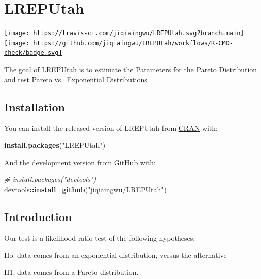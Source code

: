 \documentclass[
]{article}
\author{}
\date{\vspace{-2.5em}}
\newenvironment{Shaded}{\begin{snugshade}}{\end{snugshade}}
\newcommand{\CommentTok}[1]{\textcolor[rgb]{0.56,0.35,0.01}{\textit{#1}}}
\newcommand{\KeywordTok}[1]{\textcolor[rgb]{0.13,0.29,0.53}{\textbf{#1}}}
\newcommand{\NormalTok}[1]{#1}
\newcommand{\OperatorTok}[1]{\textcolor[rgb]{0.81,0.36,0.00}{\textbf{#1}}}
\newcommand{\StringTok}[1]{\textcolor[rgb]{0.31,0.60,0.02}{#1}}
\begin{document}
\hypertarget{lreputah}{%
\section{LREPUtah}\label{lreputah}}

\href{https://travis-ci.com/jiqiaingwu/LREPUtah}{\texttt{[image: https://travis-ci.com/jiqiaingwu/LREPUtah.svg?branch=main]}}
\href{https://github.com/jiqiaingwu/LREPUtah/actions}{\texttt{[image: https://github.com/jiqiaingwu/LREPUtah/workflows/R-CMD-check/badge.svg]}}

The goal of LREPUtah is to estimate the Parameters for the Pareto
Distribution and test Pareto vs.~Exponential Distributions

\hypertarget{installation}{%
\subsection{Installation}\label{installation}}

You can install the released version of LREPUtah from
\href{https://CRAN.R-project.org}{CRAN} with:

\begin{Shaded}
\begin{Highlighting}[]
\KeywordTok{install.packages}\NormalTok{(}\StringTok{"LREPUtah"}\NormalTok{)}
\end{Highlighting}
\end{Shaded}

And the development version from \href{https://github.com/}{GitHub}
with:

\begin{Shaded}
\begin{Highlighting}[]
\CommentTok{# install.packages("devtools")}
\NormalTok{devtools}\OperatorTok{::}\KeywordTok{install_github}\NormalTok{(}\StringTok{"jiqiaingwu/LREPUtah"}\NormalTok{)}
\end{Highlighting}
\end{Shaded}

\hypertarget{introduction}{%
\subsection{Introduction}\label{introduction}}

Our test is a likelihood ratio test of the following hypotheses:

Ho: data comes from an exponential distribution, versus the alternative

H1: data comes from a Pareto distribution.
\end{document}
